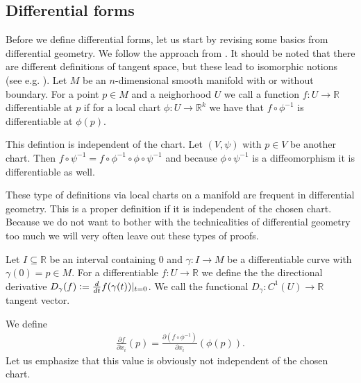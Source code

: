 \documentclass[12pt,a4paper]{article}
\numberwithin{equation}{subsection}
\numberwithin{lemma}{subsection}
\theoremstyle{definition}
\newcommand{\real}{\mathbb{R}}
\begin{document}
\subsection{Differential forms}\label{sec:differential_forms}

Before we define differential forms, let us start by revising some basics
from differential geometry. We follow the approach from 
\cite[Sec. II.5]{topology_and_geometry}. 
It should be noted that there are different definitions of tangent space, but
these lead to isomorphic notions 
(see e.g. \cite[Sec.\,1.B]{riemannian_geometry}).
Let $M$ be an $n$-dimensional smooth manifold with or without boundary.
For a point $p \in M$ and a neighorhood $U$ we call a function 
$f: U \rightarrow \real$ differentiable at $p$ if for a local chart 
$\phi: U \rightarrow \real^k$ we have that $f \circ \phi^{-1}$ is differentiable
at $\phi(p)$.

This defintion is independent of the chart. Let $(V,\psi)$ with $p \in V$ be 
another chart. 
Then $f\circ \psi^{-1} = f \circ \phi^{-1} \circ \phi \circ \psi^{-1}$ and 
because $\phi \circ \psi^{-1}$ is a diffeomorphism it is differentiable as well.

These type of definitions via local charts on a manifold are frequent in
differential geometry. This is a proper definition if it is independent of the 
chosen chart. Because we do not want to bother with the technicalities of 
differential geometry too much we will very often leave out these types of
proofs.  

Let $I \subseteq \real$ be an interval containing $0$ and 
$\gamma: I \rightarrow M$ be a differentiable curve with $\gamma(0) = p \in M$.
For a differentiable $f: U \rightarrow \real$ 
we define the the directional derivative 
$D_\gamma(f) \vcentcolon= \frac{d}{dt} f(\gamma(t)) |_{t=0}$.
We call the functional $D_\gamma: C^1(U) \rightarrow \real$ 
tangent vector. 

We define 
\begin{align}
    \frac{\partial f}{\partial x_i} (p) 
    = \frac{\partial (f \circ \phi^{-1})}{\partial x_i}(\phi(p)).
    \label{eq:derivative_on_manifold}
\end{align}
Let us emphasize that this value is obviously not independent of the chosen 
chart.
\end{document}
